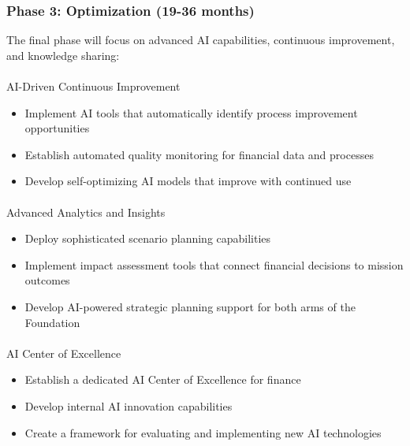 \documentclass[
]{article}
\makeatletter
\let\oldparagraph\paragraph
\renewcommand{\paragraph}{
    \@ifstar
      \xxxParagraphStar
      \xxxParagraphNoStar
  }
\newcommand{\xxxParagraphStar}[1]{\oldparagraph*{#1}\mbox{}}
\newcommand{\xxxParagraphNoStar}[1]{\oldparagraph{#1}\mbox{}}
\providecommand{\tightlist}{%
  \setlength{\itemsep}{0pt}\setlength{\parskip}{0pt}}\usepackage{longtable,booktabs,array}
\makeatother
\begin{document}
\subsubsection{Phase 3: Optimization (19-36
months)}\label{phase-3-optimization-19-36-months}

The final phase will focus on advanced AI capabilities, continuous
improvement, and knowledge sharing:

\paragraph{AI-Driven Continuous
Improvement}\label{ai-driven-continuous-improvement}

\begin{itemize}
\tightlist
\item
  Implement AI tools that automatically identify process improvement
  opportunities
\item
  Establish automated quality monitoring for financial data and
  processes
\item
  Develop self-optimizing AI models that improve with continued use
\end{itemize}

\paragraph{Advanced Analytics and
Insights}\label{advanced-analytics-and-insights}

\begin{itemize}
\tightlist
\item
  Deploy sophisticated scenario planning capabilities
\item
  Implement impact assessment tools that connect financial decisions to
  mission outcomes
\item
  Develop AI-powered strategic planning support for both arms of the
  Foundation
\end{itemize}

\paragraph{AI Center of Excellence}\label{ai-center-of-excellence}

\begin{itemize}
\tightlist
\item
  Establish a dedicated AI Center of Excellence for finance
\item
  Develop internal AI innovation capabilities
\item
  Create a framework for evaluating and implementing new AI technologies
\end{itemize}
\end{document}
